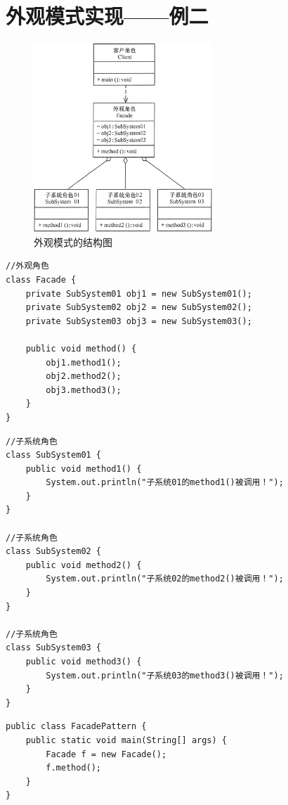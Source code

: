 \section{外观模式实现——例二}
\begin{figure}[!h]
	\centering
	\includegraphics[width=0.6\textwidth]{image/15-1}
	\caption{外观模式的结构图}
\end{figure}
\begin{lstlisting}
//外观角色
class Facade {
	private SubSystem01 obj1 = new SubSystem01();
	private SubSystem02 obj2 = new SubSystem02();
	private SubSystem03 obj3 = new SubSystem03();
	
	public void method() {
		obj1.method1();
		obj2.method2();
		obj3.method3();
	}
}
\end{lstlisting}
\begin{lstlisting}
//子系统角色
class SubSystem01 {
	public void method1() {
		System.out.println("子系统01的method1()被调用！");
	}
}

//子系统角色
class SubSystem02 {
	public void method2() {
		System.out.println("子系统02的method2()被调用！");
	}
}

//子系统角色
class SubSystem03 {
	public void method3() {
		System.out.println("子系统03的method3()被调用！");
	}
}
\end{lstlisting}
\begin{lstlisting}
public class FacadePattern {
	public static void main(String[] args) {
		Facade f = new Facade();
		f.method();
	}
}
\end{lstlisting}
